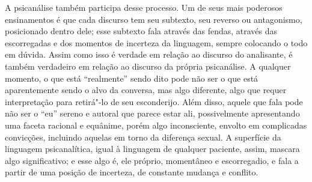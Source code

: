 A psicanálise também participa desse processo. Um de seus mais poderosos
ensinamentos é que cada discurso tem seu subtexto, seu reverso ou
antagonismo, posicionado dentro dele; esse subtexto fala através das
fendas, através das escorregadas e dos momentos de incerteza da
linguagem, sempre colocando o todo em dúvida. Assim como isso é verdade
em relação ao discurso do analisante, é também verdadeiro em relação ao
discurso da própria psicanálise. A qualquer momento, o que está
``realmente'' sendo dito pode não ser o que está aparentemente sendo o
alvo da conversa, mas algo diferente, algo que requer interpretação para
retirá"-lo de seu esconderijo. Além disso, aquele que fala pode não ser o
``eu'' sereno e autoral que parece estar ali, possivelmente apresentando
uma faceta racional e equânime, porém algo inconsciente, envolto em
complicadas convicções, incluindo aquelas em torno da diferença sexual.
A superfície da linguagem psicanalítica, igual à linguagem de qualquer
paciente, assim, mascara algo significativo; e esse algo é, ele próprio,
momentâneo e escorregadio, e fala a partir de uma posição de incerteza,
de constante mudança e conflito.

